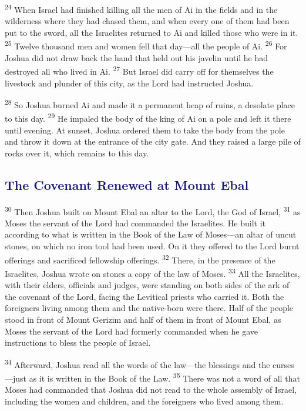 \documentclass[12pt,twoside]{article}
\newcommand{\vs}[1]{\textsuperscript{#1}}
\begin{document}
\vs{24} When Israel had finished killing all the men of Ai in the fields and in the wilderness where they had chased them, and when every one of them had been put to the sword, all the Israelites returned to Ai and killed those who were in it.
\vs{25} Twelve thousand men and women fell that day---all the people of Ai.
\vs{26} For Joshua did not draw back the hand that held out his javelin until he had destroyed all who lived in Ai.
\vs{27} But Israel did carry off for themselves the livestock and plunder of this city, as the Lord had instructed Joshua.

\vs{28} So Joshua burned Ai and made it a permanent heap of ruins, a desolate place to this day.
\vs{29} He impaled the body of the king of Ai on a pole and left it there until evening. At sunset, Joshua ordered them to take the body from the pole and throw it down at the entrance of the city gate. And they raised a large pile of rocks over it, which remains to this day.

\subsection*{\textcolor{MidnightBlue}{\textbf{The Covenant Renewed at Mount Ebal}}}

\vs{30} Then Joshua built on Mount Ebal an altar to the Lord, the God of Israel,
\vs{31} as Moses the servant of the Lord had commanded the Israelites. He built it according to what is written in the Book of the Law of Moses---an altar of uncut stones, on which no iron tool had been used. On it they offered to the Lord burnt offerings and sacrificed fellowship offerings.
\vs{32} There, in the presence of the Israelites, Joshua wrote on stones a copy of the law of Moses.
\vs{33} All the Israelites, with their elders, officials and judges, were standing on both sides of the ark of the covenant of the Lord, facing the Levitical priests who carried it. Both the foreigners living among them and the native-born were there. Half of the people stood in front of Mount Gerizim and half of them in front of Mount Ebal, as Moses the servant of the Lord had formerly commanded when he gave instructions to bless the people of Israel.

\vs{34} Afterward, Joshua read all the words of the law---the blessings and the curses---just as it is written in the Book of the Law.
\vs{35} There was not a word of all that Moses had commanded that Joshua did not read to the whole assembly of Israel, including the women and children, and the foreigners who lived among them.
\end{document}
